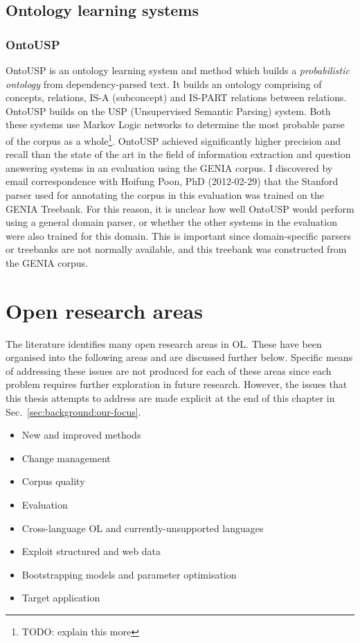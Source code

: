 \documentclass[a4paper]{report}
\newcommand{\todo}[1]{\footnote{{\color{red} TODO: #1}}}
\begin{document}
\subsection{Ontology learning systems}

\subsubsection{OntoUSP}

OntoUSP is an ontology learning system and method which builds a \emph{probabilistic ontology} from dependency-parsed text\cite{Poon2010OntoUSP}.
It builds an ontology comprising of concepts, relations, IS-A (subconcept) and IS-PART relations between relations.
OntoUSP builds on the USP (Unsupervised Semantic Parsing) system\cite{Poon09USP}.
Both these systems use Markov Logic networks to determine the most probable parse of the corpus as a whole\todo{explain this more}.
OntoUSP achieved significantly higher precision and recall than the state of the art in the field of information extraction and question answering systems in an evaluation using the GENIA\citep{KimEtAl03GeniaCorpus} corpus\cite{Poon2010OntoUSP}.
I discovered by email correspondence with Hoifung Poon, PhD (2012-02-29) that the Stanford parser\cite{Klein03PCFGParser} used for annotating the corpus in this evaluation was trained on the GENIA Treebank\cite{Tatseisi05GENIATB}.
For this reason, it is unclear how well OntoUSP would perform using a general domain parser, or whether the other systems in the evaluation were also trained for this domain.
This is important since domain-specific parsers or treebanks are not normally available, and this treebank was constructed from the GENIA corpus.

\section{Open research areas}
\label{sec:background:open-areas}

The literature identifies many open research areas in OL.
These have been organised into the following areas and are discussed further below. Specific means of addressing these issues are not produced for each of these areas since each problem requires further exploration in future research.
However, the issues that this thesis attempts to address are made explicit at the end of this chapter in Sec.~\ref{sec:background:our-focus}.

\begin{itemize}
\item New and improved methods
\item Change management
\item Corpus quality
\item Evaluation
\item Cross-language OL and currently-unsupported languages
\item Exploit structured and web data
\item Bootstrapping models and parameter optimisation
\item Target application
\end{itemize}
\end{document}
